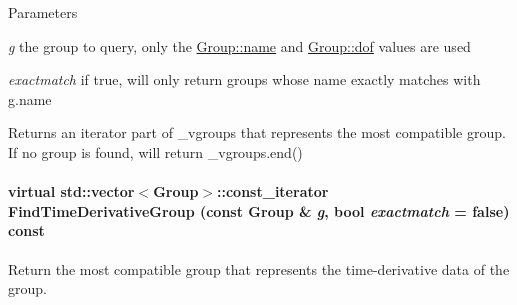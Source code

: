 \begin{DoxyParams}{Parameters}
\item[{\em g}]the group to query, only the \hyperlink{classOpenRAVE_1_1ConfigurationSpecification_1_1Group_a9b45b3e13bd9167aab02e17e08916231}{Group::name} and \hyperlink{classOpenRAVE_1_1ConfigurationSpecification_1_1Group_a03745287ca42590ead4a18807041fc66}{Group::dof} values are used \item[{\em exactmatch}]if true, will only return groups whose name exactly matches with g.name \end{DoxyParams}
\begin{DoxyReturn}{Returns}
an iterator part of \_\-vgroups that represents the most compatible group. If no group is found, will return \_\-vgroups.end() 
\end{DoxyReturn}
\hypertarget{classOpenRAVE_1_1ConfigurationSpecification_abbad5fc78067a778c4f95cf170b03c80}{
\paragraph[{FindTimeDerivativeGroup}]{\setlength{\rightskip}{0pt plus 5cm}virtual std::vector$<${\bf Group}$>$::const\_\-iterator FindTimeDerivativeGroup (const {\bf Group} \& {\em g}, \/  bool {\em exactmatch} = {\ttfamily false}) const}\hfill}
\label{classOpenRAVE_1_1ConfigurationSpecification_abbad5fc78067a778c4f95cf170b03c80}


Return the most compatible group that represents the time-\/derivative data of the group. 

